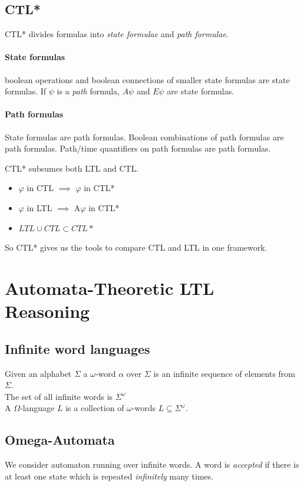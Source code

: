 \documentclass{article}
\begin{document}
\subsection{CTL*}
CTL* divides formulas into \textit{state formulae} and \textit{path formulae}.
\paragraph{State formulas} boolean operations and boolean connections of smaller state formulas are state formulas. If $\psi$ is a \textit{path} formula, $A\psi$ and $E\psi$ are state formulas.
\paragraph{Path formulas} State formulas are path formulas. Boolean combinations of path formulas are path formulas. Path/time quantifiers on path formulas are path formulas.

CTL* subsumes both LTL and CTL.
\begin{itemize}
    \item $\varphi$ in CTL $\implies$ $\varphi$ in CTL*
    \item $\varphi$ in LTL $\implies$ A$\varphi$ in CTL*
    \item $LTL \cup CTL \subset CTL*$
\end{itemize}
So CTL* gives us the tools to compare CTL and LTL in one framework.

\section{Automata-Theoretic LTL Reasoning}
\subsection{Infinite word languages}
Given an alphabet $\Sigma$ a $\omega$-word $\alpha$ over $\Sigma$ is an infinite sequence of elements from $\Sigma$.\\
The set of all infinite words is $\Sigma^\omega$\\
A $\Omega$-language $L$ is a collection of $\omega$-words $L\subseteq\Sigma^\omega$.

\subsection{Omega-Automata}
We consider automaton running over infinite words. A word is \textit{accepted} if there is at least one state which is repeated \textit{infinitely} many times.
\end{document}
